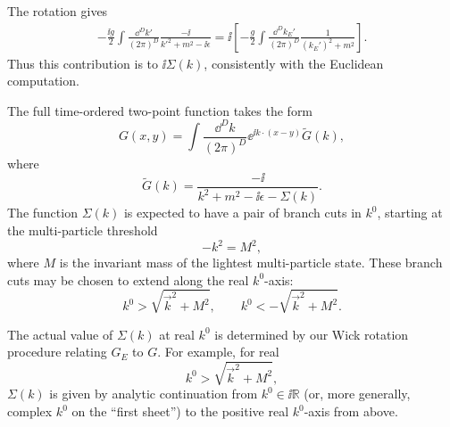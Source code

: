 The rotation gives
\[
\begin{aligned}
-\frac{\ii g}{2}
\int\frac{\dd^Dk'}{(2\pi)^D}
\frac{-\ii}{k'^2+m^2-\ii\epsilon}
=
\ii\left[
-\frac{g}{2}
\int\frac{\dd^Dk_E'}{(2\pi)^D}
\frac{1}{(k_E')^2+m^2}
\right].
\end{aligned}
\]
Thus this contribution is to \(\ii\Sigma(k)\), consistently with the
Euclidean computation.

The full time-ordered two-point function takes the form
\[
  G(x,y)
  =
  \int\frac{\dd^Dk}{(2\pi)^D}
  \ee^{\ii k\cdot(x-y)}
  \widetilde G(k),
\]
where
\[
  \widetilde G(k)
  =
  \frac{-\ii}{k^2+m^2-\ii\epsilon-\Sigma(k)}.
\]
The function \(\Sigma(k)\) is expected to have a pair of branch cuts in
\(k^0\), starting at the multi-particle threshold
\[
  -k^2=M^2,
\]
where \(M\) is the invariant mass of the lightest multi-particle state.
These branch cuts may be chosen to extend along the real \(k^0\)-axis:
\[
  k^0>\sqrt{\vec k^2+M^2},
  \qquad
  k^0<-\sqrt{\vec k^2+M^2}.
\]

\begin{center}
\end{center}

The actual value of \(\Sigma(k)\) at real \(k^0\) is determined by our Wick
rotation procedure relating \(G_E\) to \(G\). For example, for real
\[
  k^0>\sqrt{\vec k^2+M^2},
\]
\(\Sigma(k)\) is given by analytic continuation from \(k^0\in\ii\mathbb R\)
(or, more generally, complex \(k^0\) on the ``first sheet'') to the positive
real \(k^0\)-axis from above.

